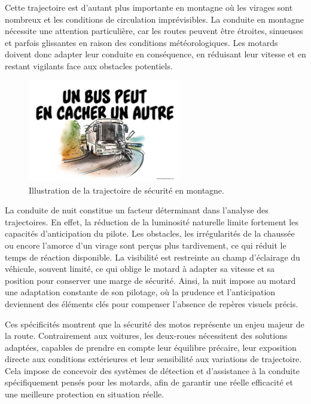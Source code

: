 Cette trajectoire est d'autant plus importante en montagne où les virages sont nombreux et les conditions de circulation imprévisibles. La conduite en montagne nécessite une attention particulière, car les routes peuvent être étroites, sinueuses et parfois glissantes en raison des conditions météorologiques. Les motards doivent donc adapter leur conduite en conséquence, en réduisant leur vitesse et en restant vigilants face aux obstacles potentiels.
\begin{figure}[H]
    \centering
    \includegraphics[width=0.6\textwidth]{etat_art/images/trajectoire-route-voie-bus-conduite_hd.jpg} 
    \caption{Illustration de la trajectoire de sécurité en montagne.}
\end{figure}
La conduite de nuit constitue un facteur déterminant dans l’analyse des trajectoires. En effet, la réduction de la luminosité naturelle limite fortement les capacités d’anticipation du pilote. Les obstacles, les irrégularités de la chaussée ou encore l’amorce d’un virage sont perçus plus tardivement, ce qui réduit le temps de réaction disponible. La visibilité est restreinte au champ d’éclairage du véhicule, souvent limité, ce qui oblige le motard à adapter sa vitesse et sa position pour conserver une marge de sécurité. 
Ainsi, la nuit impose au motard une adaptation constante de son pilotage, où la prudence et l’anticipation deviennent des éléments clés pour compenser l’absence de repères visuels précis.\\
\vspace{0.5cm}

Ces spécificités montrent que la sécurité des motos représente un enjeu majeur de la route. Contrairement aux voitures, les deux-roues nécessitent des solutions adaptées, capables de prendre en compte leur équilibre précaire, leur exposition directe aux conditions extérieures et leur sensibilité aux variations de trajectoire. Cela impose de concevoir des systèmes de détection et d’assistance à la conduite spécifiquement pensés pour les motards, afin de garantir une réelle efficacité et une meilleure protection en situation réelle.

